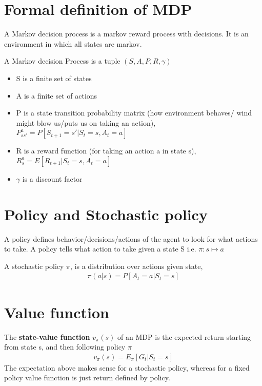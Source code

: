 \documentclass[10pt,a4paper]{article}
\begin{document}
\section{Formal definition of MDP}

A Markov decision process is a markov reward process with decisions. It is an environment in which all states are markov.

A Markov decision Process is a tuple $(S, A, P, R, \gamma)$
\begin{itemize}
	\item S is a finite set of states
	\item A is a finite set of actions
	\item P is a state transition probability matrix (how environment behaves/ wind might blow us/puts us on taking an action), \\
	$P^a_{ss'} = P[S_{t+1} = s' | S_t = s, A_t = a]$
	\item R is a reward function (for taking an action a in state s), \\
	$R_s^a = E[R_{t+1} | S_t = s, A_t = a]$
	\item $\gamma$ is a discount factor
\end{itemize}

\section{Policy and Stochastic policy}

A policy defines behavior/decisions/actions of the agent to look for what actions to take.
A policy tells what action to take given a state S i.e.
$\pi : s \mapsto a$

A stochastic policy $\pi$, is a
distribution over actions given state,
\begin{align}
	\pi(a|s) = P[A_t = a | S_t = s]
\end{align}

\section{Value function}
The \textbf{state-value function} $v_{\pi}(s)$ of an MDP is the expected return starting from state s, and then following policy $\pi$
\begin{align}
	v_{\pi}(s) = E_{\pi}[G_t | S_t = s]
\end{align}
The expectation above makes sense for a stochastic policy, whereas for a fixed policy value function is just return defined by policy. \\
\end{document}
